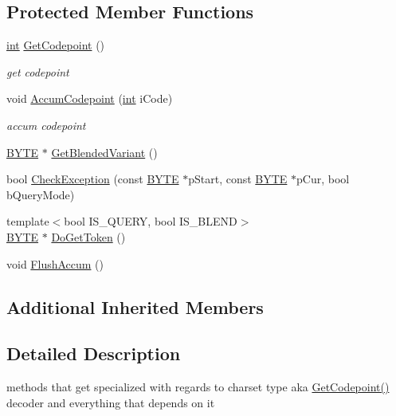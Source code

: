 \subsection*{Protected Member Functions}
\begin{DoxyCompactItemize}
\item 
\hyperlink{sphinxexpr_8cpp_a4a26e8f9cb8b736e0c4cbf4d16de985e}{int} \hyperlink{classCSphTokenizerBase2_ad80210c40774eac7e6586088f2266fbf}{Get\-Codepoint} ()
\begin{DoxyCompactList}\small\item\em get codepoint \end{DoxyCompactList}\item 
void \hyperlink{classCSphTokenizerBase2_a2d77cc595982b3c263c13bc9138f5196}{Accum\-Codepoint} (\hyperlink{sphinxexpr_8cpp_a4a26e8f9cb8b736e0c4cbf4d16de985e}{int} i\-Code)
\begin{DoxyCompactList}\small\item\em accum codepoint \end{DoxyCompactList}\item 
\hyperlink{sphinxstd_8h_a4ae1dab0fb4b072a66584546209e7d58}{B\-Y\-T\-E} $\ast$ \hyperlink{classCSphTokenizerBase2_a3a1f6fdeb8ad52fa3b3f7c322c1d0491}{Get\-Blended\-Variant} ()
\item 
bool \hyperlink{classCSphTokenizerBase2_a3008015e81c1e248f9adbf67116e8749}{Check\-Exception} (const \hyperlink{sphinxstd_8h_a4ae1dab0fb4b072a66584546209e7d58}{B\-Y\-T\-E} $\ast$p\-Start, const \hyperlink{sphinxstd_8h_a4ae1dab0fb4b072a66584546209e7d58}{B\-Y\-T\-E} $\ast$p\-Cur, bool b\-Query\-Mode)
\item 
{\footnotesize template$<$bool I\-S\-\_\-\-Q\-U\-E\-R\-Y, bool I\-S\-\_\-\-B\-L\-E\-N\-D$>$ }\\\hyperlink{sphinxstd_8h_a4ae1dab0fb4b072a66584546209e7d58}{B\-Y\-T\-E} $\ast$ \hyperlink{classCSphTokenizerBase2_afefb3fb4f17bf824d8af2adf04655a6b}{Do\-Get\-Token} ()
\item 
void \hyperlink{classCSphTokenizerBase2_af1b563c021558966d2fb2e66a4c4531a}{Flush\-Accum} ()
\end{DoxyCompactItemize}
\subsection*{Additional Inherited Members}


\subsection{Detailed Description}
methods that get specialized with regards to charset type aka \hyperlink{classCSphTokenizerBase2_ad80210c40774eac7e6586088f2266fbf}{Get\-Codepoint()} decoder and everything that depends on it 

